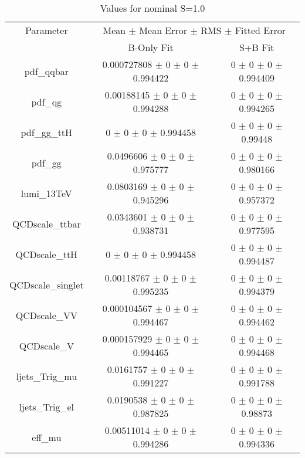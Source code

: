 \begin{table}
\centering
\caption{Values for nominal S=1.0}
\begin{tabular}{ccc}
\toprule
Parameter 	& \multicolumn{2}{c}{Mean $\pm$ Mean Error $\pm$ RMS $\pm$ Fitted Error}\\
 	& B-Only Fit & S+B Fit\\
\midrule
pdf\_qqbar 	& \num{0.000727808} $\pm$ \num{0} $\pm$ \num{0} $\pm$ \num{0.994422} 	& \num{0} $\pm$ \num{0} $\pm$ \num{0} $\pm$ \num{0.994409}\\
pdf\_qg 	& \num{0.00188145} $\pm$ \num{0} $\pm$ \num{0} $\pm$ \num{0.994288} 	& \num{0} $\pm$ \num{0} $\pm$ \num{0} $\pm$ \num{0.994265}\\
pdf\_gg\_ttH 	& \num{0} $\pm$ \num{0} $\pm$ \num{0} $\pm$ \num{0.994458} 	& \num{0} $\pm$ \num{0} $\pm$ \num{0} $\pm$ \num{0.99448}\\
pdf\_gg 	& \num{0.0496606} $\pm$ \num{0} $\pm$ \num{0} $\pm$ \num{0.975777} 	& \num{0} $\pm$ \num{0} $\pm$ \num{0} $\pm$ \num{0.980166}\\
lumi\_13TeV 	& \num{0.0803169} $\pm$ \num{0} $\pm$ \num{0} $\pm$ \num{0.945296} 	& \num{0} $\pm$ \num{0} $\pm$ \num{0} $\pm$ \num{0.957372}\\
QCDscale\_ttbar 	& \num{0.0343601} $\pm$ \num{0} $\pm$ \num{0} $\pm$ \num{0.938731} 	& \num{0} $\pm$ \num{0} $\pm$ \num{0} $\pm$ \num{0.977595}\\
QCDscale\_ttH 	& \num{0} $\pm$ \num{0} $\pm$ \num{0} $\pm$ \num{0.994458} 	& \num{0} $\pm$ \num{0} $\pm$ \num{0} $\pm$ \num{0.994487}\\
QCDscale\_singlet 	& \num{0.00118767} $\pm$ \num{0} $\pm$ \num{0} $\pm$ \num{0.995235} 	& \num{0} $\pm$ \num{0} $\pm$ \num{0} $\pm$ \num{0.994379}\\
QCDscale\_VV 	& \num{0.000104567} $\pm$ \num{0} $\pm$ \num{0} $\pm$ \num{0.994467} 	& \num{0} $\pm$ \num{0} $\pm$ \num{0} $\pm$ \num{0.994462}\\
QCDscale\_V 	& \num{0.000157929} $\pm$ \num{0} $\pm$ \num{0} $\pm$ \num{0.994465} 	& \num{0} $\pm$ \num{0} $\pm$ \num{0} $\pm$ \num{0.994468}\\
ljets\_Trig\_mu 	& \num{0.0161757} $\pm$ \num{0} $\pm$ \num{0} $\pm$ \num{0.991227} 	& \num{0} $\pm$ \num{0} $\pm$ \num{0} $\pm$ \num{0.991788}\\
ljets\_Trig\_el 	& \num{0.0190538} $\pm$ \num{0} $\pm$ \num{0} $\pm$ \num{0.987825} 	& \num{0} $\pm$ \num{0} $\pm$ \num{0} $\pm$ \num{0.98873}\\
eff\_mu 	& \num{0.00511014} $\pm$ \num{0} $\pm$ \num{0} $\pm$ \num{0.994286} 	& \num{0} $\pm$ \num{0} $\pm$ \num{0} $\pm$ \num{0.994336}\\

\end{tabular}
\end{table}
